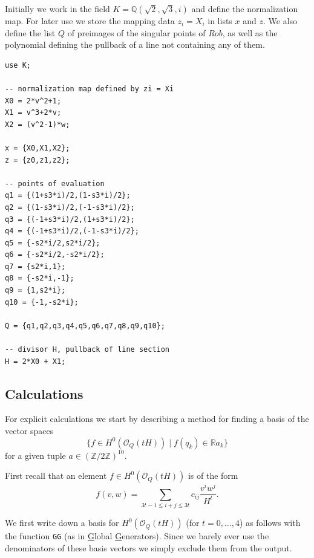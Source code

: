 \documentclass[a4paper,10pt]{amsart}
\theoremstyle{definition}
\theoremstyle{plain}
\newcommand{\cO}{{\mathcal O}}
\newcommand{\R}{{\mathbb R}}
\newcommand{\Q}{{\mathbb Q}}
\newcommand{\Z}{{\mathbb Z}}
\begin{document}
Initially we work in the field $K = \Q(\sqrt{2}, \sqrt{3}, i)$ and define the normalization map. For later use we store the mapping data $z_i = X_i$ in lists $x$ and $z$. We also define the list $Q$ of preimages of the singular points of $Rob$, as well as the polynomial defining the pullback of a line not containing any of them.

\begin{oframed}
\begin{verbatim}
use K;

-- normalization map defined by zi = Xi
X0 = 2*v^2+1;
X1 = v^3+2*v;
X2 = (v^2-1)*w;

x = {X0,X1,X2};
z = {z0,z1,z2};

-- points of evaluation
q1 = {(1+s3*i)/2,(1-s3*i)/2};
q2 = {(1-s3*i)/2,(-1-s3*i)/2};
q3 = {(-1+s3*i)/2,(1+s3*i)/2};
q4 = {(-1+s3*i)/2,(-1-s3*i)/2};
q5 = {-s2*i/2,s2*i/2};
q6 = {-s2*i/2,-s2*i/2};
q7 = {s2*i,1}; 
q8 = {-s2*i,-1};
q9 = {1,s2*i};
q10 = {-1,-s2*i};

Q = {q1,q2,q3,q4,q5,q6,q7,q8,q9,q10};

-- divisor H, pullback of line section
H = 2*X0 + X1;
\end{verbatim}
\end{oframed}


\subsection{Calculations}

For explicit calculations we start by describing a method for finding a basis of the vector spaces
\begin{equation*}
    \{ f \in H^0(\cO_Q(tH)) \mid f(q_k) \in \R a_k \}
\end{equation*}
for a given tuple $a \in (\Z/2\Z)^{10}$.

First recall that an element $f \in H^0(\cO_Q(tH))$ is of the form
\begin{equation*}
    f(v,w) = \sum_{3t-1 \leq i+j \leq 3t} c_{ij} \frac{v^iw^j}{H^t}.
\end{equation*}

We first write down a basis for $H^0(\cO_Q(tH))$ (for $t = 0, \dots, 4$) as follows with the function \texttt{GG} (as in \underline{G}lobal \underline{G}enerators). Since we barely ever use the denominators of these basis vectors we simply exclude them from the output.
\end{document}
